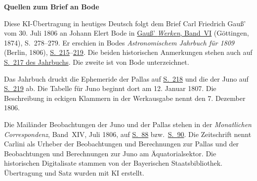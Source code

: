 \clearpage\thispagestyle{empty}
\begin{center}\textbf{Quellen zum Brief an Bode}\end{center}
\noindent Diese KI-Übertragung in heutiges Deutsch folgt dem Brief Carl Friedrich Gauß’ vom 30. Juli 1806 an Johann Elert Bode in \href{https://gdz.sub.uni-goettingen.de/id/PPN236007467}{Gauß’ \textit{Werken}, Band~VI} (Göttingen, 1874), S.~278--279. Er erschien in Bodes \textit{Astronomischem Jahrbuch für 1809} (Berlin, 1806), \href{https://www.digitale-sammlungen.de/en/view/bsb10538338?page=225}{S.~215}--\href{https://www.digitale-sammlungen.de/en/view/bsb10538338?page=229}{219}. Die beiden historischen Anmerkungen stehen auch auf \href{https://www.digitale-sammlungen.de/en/view/bsb10538338?page=227}{S.~217 des Jahrbuchs}. Die zweite ist von Bode unterzeichnet.
\par\medskip
Das Jahrbuch druckt die Ephemeride der Pallas auf \href{https://www.digitale-sammlungen.de/en/view/bsb10538338?page=228}{S.~218} und die der Juno auf \href{https://www.digitale-sammlungen.de/en/view/bsb10538338?page=229}{S.~219} ab. Die Tabelle für Juno beginnt dort am 12. Januar 1807. Die Beschreibung in eckigen Klammern in der Werkausgabe nennt den 7. Dezember 1806.
\par\medskip
Die Mailänder Beobachtungen der Juno und der Pallas stehen in der \textit{Monatlichen Correspondenz}, Band~XIV, Juli 1806, auf \href{https://www.digitale-sammlungen.de/en/view/bsb10538606?page=98}{S.~88} bzw.\ \href{https://www.digitale-sammlungen.de/en/view/bsb10538606?page=100}{S.~90}. Die Zeitschrift nennt Carlini als Urheber der Beobachtungen und Berechnungen zur Pallas und der Beobachtungen und Berechnungen zur Juno am Äquatorialsektor. Die historischen Digitalisate stammen von der Bayerischen Staatsbibliothek. Übertragung und Satz wurden mit KI erstellt.
\clearpage
